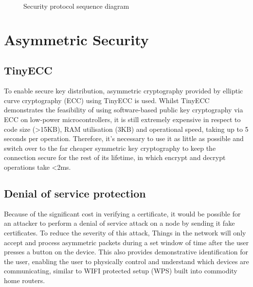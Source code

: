 \documentclass[conference]{./sty/IEEEtran}
\begin{document}
\begin{figure}[h!]
\begin{center}

\caption{Security protocol sequence diagram}
\label{fig:sequence_diagram}
\end{center}
\end{figure}

\section{Asymmetric Security} %
\label{sec:asymmetric_security}
\subsection{TinyECC} %
\label{sub:tinyecc}
To enable secure key distribution, asymmetric cryptography provided by elliptic curve cryptography (ECC) using TinyECC\cite{TinyECC} is used. Whilst TinyECC demonstrates the feasibility of using software-based public key cryptography via ECC on low-power microcontrollers, it is still extremely expensive in respect to code size (\textgreater15KB), RAM utilisation (3KB) and operational speed, taking up to 5 seconds per operation. Therefore, it's necessary to use it as little as possible and switch over to the far cheaper symmetric key cryptography to keep the connection secure for the rest of its lifetime, in which encrypt and decrypt operations take \textless 2ms.

\subsection{Denial of service protection} %
\label{sub:denial_of_service_protection}
Because of the significant cost in verifying a certificate, it would be possible for an attacker to perform a denial of service attack on a node by sending it fake certificates. To reduce the severity of this attack, Things in the network will only accept and process asymmetric packets during a set window of time after the user presses a button on the device. This also provides demonstrative identification for the user, enabling the user to physically control and understand which devices are communicating, similar to WIFI protected setup (WPS) built into commodity home routers.
\end{document}
